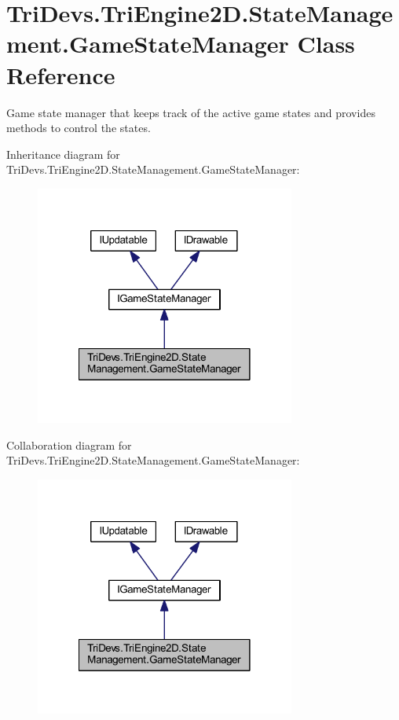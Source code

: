 \hypertarget{class_tri_devs_1_1_tri_engine2_d_1_1_state_management_1_1_game_state_manager}{\section{Tri\-Devs.\-Tri\-Engine2\-D.\-State\-Management.\-Game\-State\-Manager Class Reference}
\label{class_tri_devs_1_1_tri_engine2_d_1_1_state_management_1_1_game_state_manager}
}


Game state manager that keeps track of the active game states and provides methods to control the states.  




Inheritance diagram for Tri\-Devs.\-Tri\-Engine2\-D.\-State\-Management.\-Game\-State\-Manager\-:
\nopagebreak
\begin{figure}[H]
\begin{center}
\leavevmode
\includegraphics[width=242pt]{class_tri_devs_1_1_tri_engine2_d_1_1_state_management_1_1_game_state_manager__inherit__graph}
\end{center}
\end{figure}


Collaboration diagram for Tri\-Devs.\-Tri\-Engine2\-D.\-State\-Management.\-Game\-State\-Manager\-:
\nopagebreak
\begin{figure}[H]
\begin{center}
\leavevmode
\includegraphics[width=242pt]{class_tri_devs_1_1_tri_engine2_d_1_1_state_management_1_1_game_state_manager__coll__graph}
\end{center}
\end{figure}
